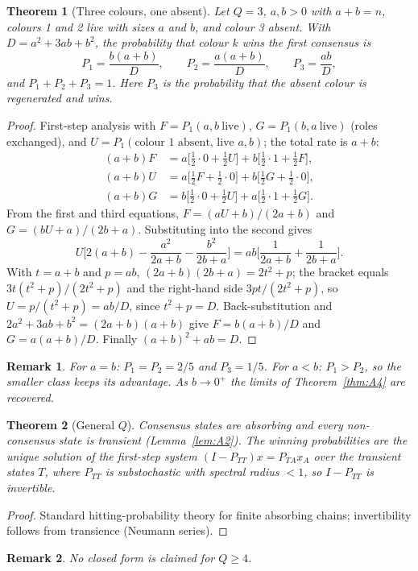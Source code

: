 \documentclass[pdflatex,sn-mathphys-num]{sn-jnl}
\theoremstyle{thmstyleone}%
\newtheorem{theorem}{Theorem}[section]
\theoremstyle{thmstylethree}%
\theoremstyle{thmstyletwo}%
\newtheorem{remark}{Remark}[theorem]
\begin{document}
\begin{theorem}[Three colours, one absent]
\label{thm:A5}
Let $Q=3$, $a,b>0$ with $a+b=n$, colours 1 and 2 live with sizes $a$ and
$b$, and colour 3 absent. With $D=a^2+3ab+b^2$, the probability that
colour $k$ wins the first consensus is
\[
P_1=\frac{b(a+b)}{D},\qquad P_2=\frac{a(a+b)}{D},\qquad P_3=\frac{ab}{D},
\]
and $P_1+P_2+P_3=1$. Here $P_3$ is the probability that the absent colour
is regenerated and wins.
\end{theorem}
\begin{proof}
First-step analysis with $F=P_1(a,b\ \mathrm{live})$,
$G=P_1(b,a\ \mathrm{live})$ (roles exchanged), and
$U=P_1(\text{colour }1\text{ absent, live }a,b)$; the total rate is $a+b$:
\begin{align*}
(a+b)F &= a\Big[\tfrac12\cdot0+\tfrac12 U\Big]
       + b\Big[\tfrac12\cdot1+\tfrac12 F\Big],\\
(a+b)U &= a\Big[\tfrac12 F+\tfrac12\cdot0\Big]
       + b\Big[\tfrac12 G+\tfrac12\cdot0\Big],\\
(a+b)G &= b\Big[\tfrac12\cdot0+\tfrac12 U\Big]
       + a\Big[\tfrac12\cdot1+\tfrac12 G\Big].
\end{align*}
From the first and third equations, $F=(aU+b)/(2a+b)$ and
$G=(bU+a)/(2b+a)$. Substituting into the second gives
\[
U\Big[2(a+b)-\frac{a^2}{2a+b}-\frac{b^2}{2b+a}\Big]
=ab\Big[\frac1{2a+b}+\frac1{2b+a}\Big].
\]
With $t=a+b$
and $p=ab$, $(2a+b)(2b+a)=2t^2+p$; the bracket equals
$3t(t^2+p)/(2t^2+p)$ and the right-hand side $3pt/(2t^2+p)$, so
$U=p/(t^2+p)=ab/D$, since $t^2+p=D$. Back-substitution and
$2a^2+3ab+b^2=(2a+b)(a+b)$ give $F=b(a+b)/D$ and $G=a(a+b)/D$. Finally
$(a+b)^2+ab=D$.
\end{proof}
\begin{remark}
\label{rem:A5.1}
For $a=b$: $P_1=P_2=2/5$ and $P_3=1/5$. For $a<b$: $P_1>P_2$, so the
smaller class keeps its advantage. As $b\to0^+$ the limits of
Theorem~\ref{thm:A4} are recovered.
\end{remark}

\begin{theorem}[General $Q$]
\label{thm:A6}
Consensus states are absorbing and every non-consensus state is transient
(Lemma~\ref{lem:A2}). The winning probabilities are the unique solution
of the first-step system $(I-P_{TT})x=P_{TA}x_A$ over the transient states
$T$, where $P_{TT}$ is substochastic with spectral radius $<1$, so
$I-P_{TT}$ is invertible.
\end{theorem}
\begin{proof}
Standard hitting-probability theory for finite absorbing chains;
invertibility follows from transience (Neumann series).
\end{proof}
\begin{remark}
\label{rem:A6.1}
No closed form is claimed for $Q\ge4$.
\end{remark}
\end{document}
